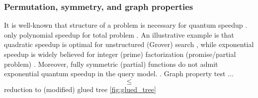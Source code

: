 \subsubsection{Permutation, symmetry, and graph properties}
It is well-known that structure of a problem is necessary for quantum speedup \cite{aaronsonNeedStructureQuantum2014}.
only polynomial speedup for total problem \cite{bealsQuantumLowerBounds2001} \cite{aaronsonQuantumImplicationsHuang2020}.
An illustrative example is that quadratic speedup is optimal for unstructured (Grover) search \cite{groverQuantumMechanicsHelps1997}, while exponential speedup is widely believed for integer (prime) factorization (promise/partial problem) \cite{shorPolynomialTimeAlgorithmsPrime1997}.
Moreover, fully symmetric (partial) functions do not admit exponential quantum speedup in the query model.
\cite{ben-davidSymmetriesGraphProperties2020}.
Graph property test ...
\begin{equation}
	\le 
\end{equation}
reduction to (modified) glued tree \cref{fig:glued_tree}


